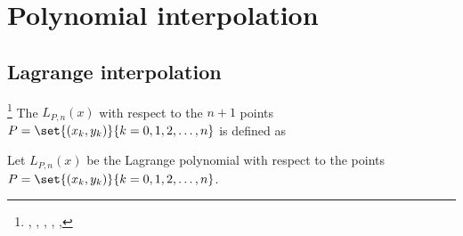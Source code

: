 \section{Polynomial interpolation}
\subsection{Lagrange interpolation}
\begin{definition}
\footnote{
  ,
  ,
  ,
  ,
  ,
  }
\label{def:Ln(x)}
\label{def:lagpoly}
\label{def:laginterp}
The  $L_{P,n}(x)$ with respect to the $n+1$ points \\
$P=\set{(x_k,y_k)}{k=0,1,2,\ldots,n}$ is defined as
\end{definition}

\begin{proposition}
Let $L_{P,n}(x)$ be the Lagrange polynomial with respect to the points\\
$P=\set{(x_k,y_k)}{k=0,1,2,\ldots,n}$.
\end{proposition}

